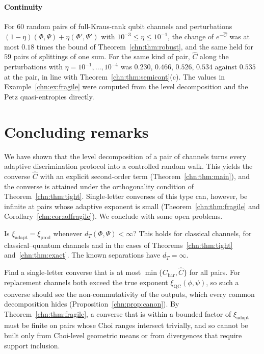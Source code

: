 \paragraph{Continuity} For $60$ random pairs of full-Kraus-rank qubit channels and perturbations $(1-\eta)(\Phi,\Psi)+\eta(\Phi',\Psi')$ with $10^{-3}\le\eta\le10^{-1}$, the change of $e^{-\widehat C}$ was at most $0.18$ times the bound of Theorem~\ref{chn:thm:robust}, and the same held for $59$ pairs of splittings of one sum. For the same kind of pair, $\widehat C$ along the perturbations with $\eta=10^{-1},\dots,10^{-4}$ was $0.230$, $0.466$, $0.526$, $0.534$ against $0.535$ at the pair, in line with Theorem~\ref{chn:thm:semicont}(c). The values in Example~\ref{chn:ex:fragile} were computed from the level decomposition and the Petz quasi-entropies directly.

\section{Concluding remarks}\label{chn:sec:open}

We have shown that the level decomposition of a pair of channels turns every adaptive discrimination protocol into a controlled random walk. This yields the converse $\widehat C$ with an explicit second-order term (Theorem~\ref{chn:thm:main}), and the converse is attained under the orthogonality condition of Theorem~\ref{chn:thm:tight}. Single-letter converses of this type can, however, be infinite at pairs whose adaptive exponent is small (Theorem~\ref{chn:thm:fragile} and Corollary~\ref{chn:cor:adfragile}). We conclude with some open problems.

\begin{question}\label{chn:q:prod}
Is $\xi_{\mathrm{adapt}}=\xi_{\mathrm{prod}}$ whenever $d_T(\Phi,\Psi)<\infty$? This holds for classical channels, for classical--quantum channels \cite{SalekHayashiWinter2022} and in the cases of Theorems~\ref{chn:thm:tight} and~\ref{chn:thm:exact}. The known separations \cite{HHLW2010,SalekHayashiWinter2022} have $d_T=\infty$.
\end{question}

\begin{question}\label{chn:q:single}
Find a single-letter converse that is at most $\min\{C_{\mathrm{bar}},\widehat C\}$ for all pairs. For replacement channels both exceed the true exponent $\xi_{\mathrm{QC}}(\phi,\psi)$, so such a converse should see the non-commutativity of the outputs, which every common decomposition hides (Proposition~\ref{chn:prop:canon}). By Theorem~\ref{chn:thm:fragile}, a converse that is within a bounded factor of $\xi_{\mathrm{adapt}}$ must be finite on pairs whose Choi ranges intersect trivially, and so cannot be built only from Choi-level geometric means or from divergences that require support inclusion.
\end{question}

